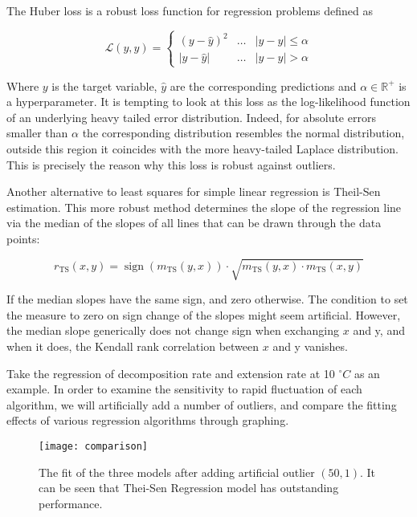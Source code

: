 \documentclass{mcmthesis}
\begin{document}
The Huber loss is a robust loss function for regression problems defined as

\begin{equation}
  \mathcal{L}(y, \hat{y})=\left\{\begin{array}{lll}
  (y-\hat{y})^{2} & \ldots & |y-\hat{y}| \leq \alpha \\
  |y-\hat{y}| & \ldots & |y-\hat{y}|>\alpha
  \end{array}\right.
\end{equation}

Where $y$ is the target variable, $ \hat{y} $ are the corresponding predictions and $ \alpha \in \mathbb{R}^+ $ is a hyperparameter. It is tempting to look at this loss as the log-likelihood function of an underlying heavy tailed error distribution. Indeed, for absolute errors smaller than $\alpha$ the corresponding distribution resembles the normal distribution, outside this region it coincides with the more heavy-tailed Laplace distribution. This is precisely the reason why this loss is robust against outliers. \cite{huber_regression}

Another alternative to least squares for simple linear regression is Theil-Sen estimation. This more robust method determines the slope of the regression line via the median of the slopes of all lines that can be drawn through the data points:

\begin{equation}
  r_{\mathrm{TS}}(x, y)=\operatorname{sign}\left(m_{\mathrm{TS}}(y, x)\right) \cdot \sqrt{m_{\mathrm{TS}}(y, x) \cdot m_{\mathrm{TS}}(x, y)}
\end{equation}

If the median slopes have the same sign, and zero otherwise. The condition to set the measure to zero on sign change of the slopes might seem artificial. However, the median slope generically does not change sign when exchanging $x$ and y, and when it does, the Kendall rank correlation between $x$ and y vanishes.\cite{theil_sen_regression}

Take the regression of decomposition rate and extension rate at 10 $ ^\circ C $ as an example. In order to examine the sensitivity to rapid fluctuation of each algorithm, we will artificially add a number of outliers, and compare the fitting effects of various regression algorithms through graphing.

\begin{figure}[H]
  \small
  \centering
  \texttt{[image: comparison]}
  \caption{The fit of the three models after adding artificial outlier $(50, 1)$. It can be seen that Thei-Sen Regression model has outstanding performance.}
  \label{comparison}
\end{figure}
\end{document}
